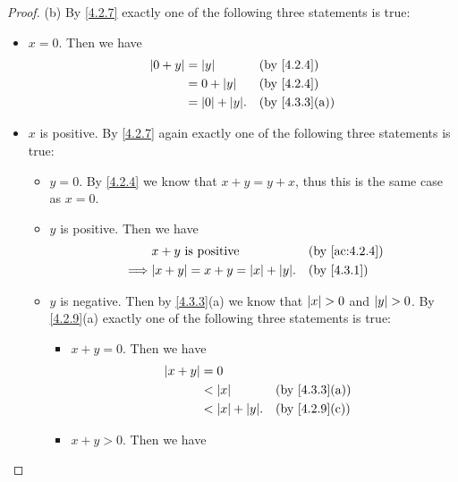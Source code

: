\begin{proof}{(b)}
	By \cref{4.2.7} exactly one of the following three statements is true:
	\begin{itemize}
		\item \(x = 0\).
		      Then we have
		      \begin{align*}
			      \abs{0 + y} & = \abs{y}            &  & \by{4.2.4}                  \\
			                  & = 0 + \abs{y}        &  & \by{4.2.4}                  \\
			                  & = \abs{0} + \abs{y}. &  & \text{(by \cref{4.3.3}(a))}
		      \end{align*}
		\item \(x\) is positive.
		      By \cref{4.2.7} again exactly one of the following three statements is true:
		      \begin{itemize}
			      \item \(y = 0\).
			            By \cref{4.2.4} we know that \(x + y = y + x\), thus this is the same case as \(x = 0\).
			      \item \(y\) is positive.
			            Then we have
			            \begin{align*}
				                     & x + y \text{ is positive}                &  & \by{ac:4.2.4} \\
				            \implies & \abs{x + y} = x + y = \abs{x} + \abs{y}. &  & \by{4.3.1}
			            \end{align*}
			      \item \(y\) is negative.
			            Then by \cref{4.3.3}(a) we know that \(\left\lvert x\right\rvert > 0\) and \(\left\lvert y\right\rvert > 0\).
			            By \cref{4.2.9}(a) exactly one of the following three statements is true:
			            \begin{itemize}
				            \item \(x + y = 0\).
				                  Then we have
				                  \begin{align*}
					                  \abs{x + y} & = 0                                                   \\
					                              & < \abs{x}            &  & \text{(by \cref{4.3.3}(a))} \\
					                              & < \abs{x} + \abs{y}. &  & \text{(by \cref{4.2.9}(c))}
				                  \end{align*}
				            \item \(x + y > 0\).
				                  Then we have

\end{itemize}
\end{itemize}
\end{itemize}
\end{proof}
